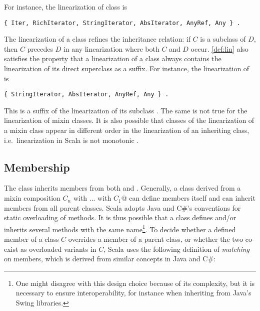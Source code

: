 \documentclass[a4paper,11pt,twoside]{article}
\begin{document}
For instance, the linearization of class \lstinline@Iter@ is
\begin{lstlisting}
{ Iter, RichIterator, StringIterator, AbsIterator, AnyRef, Any } .
\end{lstlisting}
The linearization of a class refines the inheritance relation: if
$C$ is a subclass of $D$, then $C$ precedes $D$ in any linearization
where both $C$ and $D$ occur.
\ref{def:lin} also satisfies the property that a linearization
of a class always contains the linearization of its direct superclass
as a suffix.  For instance, the linearization of
\lstinline@StringIterator@ is
\begin{lstlisting}
{ StringIterator, AbsIterator, AnyRef, Any } .
\end{lstlisting}
This is a suffix of the linearization of its subclass \lstinline@Iter@.
The same is not true for the linearization of mixin classes.
It is also possible that classes of the linearization of a mixin class
appear in different order in the linearization of an inheriting class, i.e.\ 
linearization in Scala is not monotonic \cite{c3-dylan}.

\subsection*{Membership}

The \lstinline@Iter@ class inherits members from both
\lstinline@StringIterator@ and \lstinline@RichIterator@. Generally, a
class derived from a mixin composition 
\lstinline@$C_n$ with ... with $C_1$@ can define members itself and can
inherit members from all parent classes. Scala adopts Java and C\#'s
conventions for static overloading of methods. It is thus possible
that a class defines and/or inherits several methods with the same
name\footnote{One might disagree with this design choice because of its
complexity, but it is necessary to ensure interoperability, for instance
when inheriting from Java's Swing libraries.}.
To decide whether a defined member of a class $C$ overrides a
member of a parent class, or whether the two co-exist as overloaded
variants in $C$, Scala uses the following definition of {\em matching}
on members, which is derived from similar concepts in Java and C\#:
\end{document}

